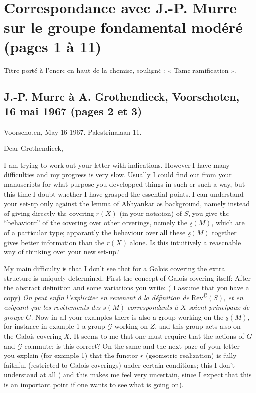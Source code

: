 \documentclass[11pt,a4paper]{article}
\begin{document}
\section*{Correspondance avec J.-P. Murre sur le groupe fondamental modéré (pages 1 à 11)}

Titre porté à l'encre en haut de la chemise, souligné : « Tame ramification ».

\subsection*{J.-P. Murre à A. Grothendieck, Voorschoten, 16 mai 1967 (pages 2 et 3)}

Voorschoten, May 16 1967. Palestrinalaan 11.

Dear Grothendieck,

I am trying to work out your letter with indications. However I have many
difficulties and my progress is very slow. Usually I could find out from your
manuscripts for what purpose you developped things in such or such a way, but
this time I doubt whether I have grasped the essential points. I can understand
your set-up only against the lemma of Abhyankar as background, namely instead
of giving directly the covering $r(X)$ (in your notation) of $S$, you give the
``behaviour'' of the covering over other coverings, namely the $\underline{s}(M)$,
which are of a particular type; apparantly the behaviour over all these
$\underline{s}(M)$ together gives better information than the $r(X)$ alone. Is
this intuitively a reasonable way of thinking over your new set-up?

My main difficulty is that I don't see that for a Galois covering the extra
structure is uniquely determined. First the concept of Galois covering itself:
After the abstract definition and some variations you write: ( I assume that
you have a copy) \emph{On peut enfin l'expliciter en revenant à la définition
de $\mathrm{Rev}^{\underline{R}}(S)$, et en exigeant que les revêtements des
$\underline{s}(M)$ correspondants à $X$ soient principaux de groupe $G$.} Now
in all your examples there is also a group working on the $\underline{s}(M)$,
for instance in example 1 a group $\mathcal{G}$ working on $Z$, and this group
acts also on the Galois covering $X$. It seems to me that one must require that
the actions of $G$ and $\mathcal{G}$ commute; is this correct? On the same and
the next page of your letter you explain (for example 1) that the functor
$\underline{r}$ (geometric realization) is fully faithful (restricted to Galois
coverings) under certain conditions; this I don't understand at all ( and
 this makes me feel very uncertain, since I expect that this is
an important point if one wants to see what is going on).
\end{document}
